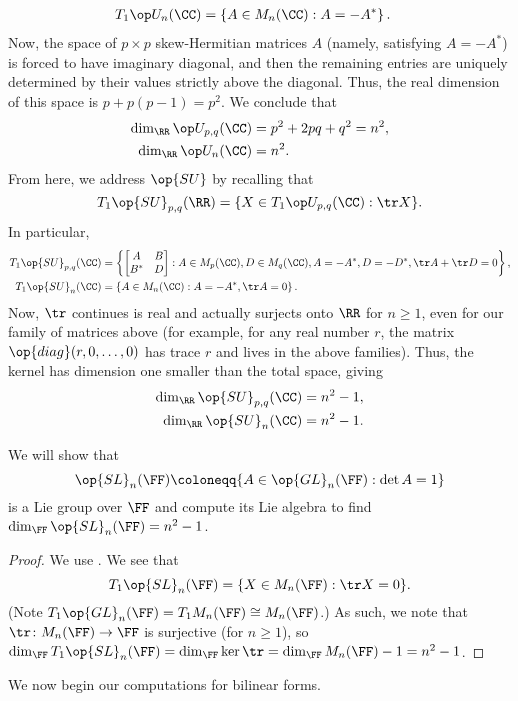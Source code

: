 \documentclass[../notes.tex]{subfiles}
\begin{document}
\begin{listalph}
\begin{align*}
		T_1\op U_n(\CC) &= \left\{A\in M_n(\CC):A=-A^*\right\}.
	\end{align*}
	Now, the space of $p\times p$ skew-Hermitian matrices $A$ (namely, satisfying $A=-A^*$) is forced to have imaginary diagonal, and then the remaining entries are uniquely determined by their values strictly above the diagonal. Thus, the real dimension of this space is $p+p(p-1)=p^2$. We conclude that
	\begin{align*}
		\dim_\RR\op U_{p,q}(\CC) &= p^2+2pq+q^2=n^2, \\
		\dim_\RR\op U_n(\CC) &= n^2.
	\end{align*}
	From here, we address $\op{SU}$ by recalling that
	\[T_1\op{SU}_{p,q}(\RR)=\{X\in T_1\op U_{p,q}(\CC):\tr X\}.\]
	In particular,
	\begin{align*}
		T_1\op{SU}_{p,q}(\CC) &= \left\{\begin{bmatrix}
			A & B \\ B^* & D
		\end{bmatrix}:A\in M_p(\CC),D\in M_q(\CC),A=-A^*,D=-D^*,\tr A+\tr D=0\right\}, \\
		T_1\op{SU}_n(\CC) &= \left\{A\in M_n(\CC):A=-A^*,\tr A=0\right\}.
	\end{align*}
	Now, $\tr$ continues is real and actually surjects onto $\RR$ for $n\ge1$, even for our family of matrices above (for example, for any real number $r$, the matrix $\op{diag}(r,0,\ldots,0)$ has trace $r$ and lives in the above families). Thus, the kernel has dimension one smaller than the total space, giving
	\begin{align*}
		\dim_\RR\op{SU}_{p,q}(\CC) &= n^2-1, \\
		\dim_\RR\op{SU}_n(\CC) &= n^2-1.
	\end{align*}
\end{listalph}
\begin{example}
	We will show that
	\[\op{SL}_n(\FF)\coloneqq\{A\in\op{GL}_n(\FF):\det A=1\}\]
	is a Lie group over $\FF$ and compute its Lie algebra to find $\dim_\FF\op{SL}_n(\FF)=n^2-1$.
\end{example}
\begin{proof}
	We use . We see that
	\[{T_1\op{SL}_n(\FF)=\{X\in M_n(\FF):\tr X=0\}}.\]
	(Note $T_1\op{GL}_n(\FF)=T_1M_n(\FF)\cong M_n(\FF)$.) As such, we note that $\tr\colon M_n(\FF)\to\FF$ is surjective (for $n\ge1$), so $\dim_\FF T_1\op{SL}_n(\FF)=\dim_\FF\ker\tr=\dim_\FF M_n(\FF)-1=n^2-1$.
\end{proof}
We now begin our computations for bilinear forms.
\end{document}
